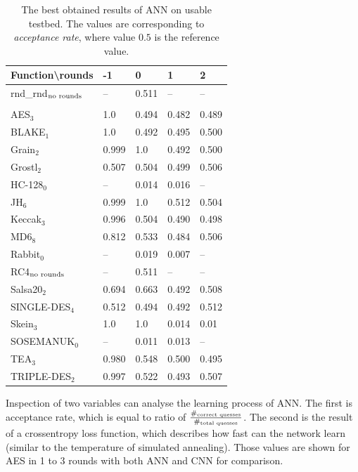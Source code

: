 \documentclass[
  print, %
  Table,   %
  nolof,     %
  nolot,     %
  11pt, %
  oneside  %
]{fithesis3}
\newcommand{\fd}{\cellcolor{red!13}}
\newcommand{\fn}{\cellcolor{green!13}}
\begin{document}
\begin{table}[H]
\centering
\begin{tabular}{l|l l l l}
Function\textbackslash{}rounds & -1 & 0 & 1 & 2\\ \hline
rnd\_rnd$_{\textnormal{no rounds}}$& -- & \fn{}0.511 & --         & --         \\\\
AES$_{3}$        & \fd{}1.0   & \fn{}0.494 & \fn{}0.482 & \fn{}0.489 \\
BLAKE$_{1}$      & \fd{}1.0   & \fn{}0.492 & \fn{}0.495 & \fn{}0.500 \\
Grain$_{2}$      & \fd{}0.999 & \fd{}1.0   & \fn{}0.492 & \fn{}0.500 \\
Grostl$_{2}$     & \fn{}0.507 & \fn{}0.504 & \fn{}0.499 & \fn{}0.506 \\
HC-128$_{0}$     & \fd{}--    & \fn{}0.014 & \fn{}0.016 & \fn{}--    \\
JH$_{6}$         & \fd{}0.999 & \fd{}1.0   & \fn{}0.512 & \fn{}0.504 \\
Keccak$_{3}$     & \fd{}0.996 & \fn{}0.504 & \fn{}0.490 & \fn{}0.498 \\
MD6$_{8}$        & \fd{}0.812 & \fd{}0.533 & \fn{}0.484 & \fn{}0.506 \\
Rabbit$_{0}$     & \fd{}--    & \fn{}0.019 & \fn{}0.007 & \fn{}--    \\
RC4$_{\textnormal{no rounds}}$& --         & \fn{}0.511 & --         & --         \\
Salsa20$_{2}$    & \fd{}0.694 & \fd{}0.663 & \fn{}0.492 & \fn{}0.508 \\
SINGLE-DES$_{4}$ & \fd{}0.512 & \fn{}0.494 & \fn{}0.492 & \fn{}0.512 \\
Skein$_{3}$      & \fd{}1.0   & \fd{}1.0   & \fn{}0.014 & \fn{}0.01  \\
SOSEMANUK$_{0}$  & \fd{}--    & \fn{}0.011 & \fn{}0.013 & \fn{}--    \\
TEA$_{3}$        & \fd{}0.980 & \fd{}0.548 & \fn{}0.500 & \fn{}0.495 \\
TRIPLE-DES$_{2}$ & \fd{}0.997 & \fd{}0.522 & \fn{}0.493 & \fn{}0.507
\end{tabular}
\caption{The best obtained results of ANN on usable testbed. The values are corresponding to \textit{acceptance rate}, where value $0.5$ is the reference value.}
\label{table:res-usable-ann}
\end{table}

Inspection of two variables can analyse the learning process of ANN. The first is acceptance rate, which is equal to ratio of $\frac{\#_{\textnormal{correct quesses}}}{\#_{\textnormal{total quesses}}}$. The second is the result of a crossentropy loss function, which describes how fast can the network learn (similar to the temperature of simulated annealing). Those values are shown for AES in 1 to 3 rounds with both ANN and CNN for comparison.
\end{document}
